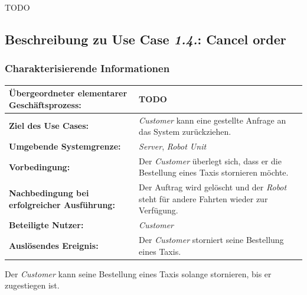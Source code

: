 				TODO
				
				
				\pagebreak
		
			\subsection*{Beschreibung zu Use Case \emph{1.4.}: Cancel order}
				\subsubsection*{Charakterisierende Informationen}
				
				\begin{table}[H]
					\centering
					\begin{tabularx}{\textwidth}{|p{5cm}|X|}
						\hline
						\textbf{Übergeordneter elementarer Geschäftsprozess:} & TODO  \\ \hline
						\textbf{Ziel des Use Cases:} & \emph{Customer} kann eine gestellte Anfrage an das System zurückziehen. \\ \hline
						\textbf{Umgebende Systemgrenze:} & \emph{Server}, \emph{Robot Unit} \\ \hline
						\textbf{Vorbedingung:} & Der \emph{Customer} überlegt sich, dass er die Bestellung eines Taxis stornieren möchte. \\ \hline
						\textbf{Nachbedingung bei erfolgreicher Ausführung:} & Der Auftrag wird gelöscht und der \emph{Robot} steht für andere Fahrten wieder zur Verfügung. \\ \hline
						\textbf{Beteiligte Nutzer:} & \emph{Customer} \\ \hline
						\textbf{Auslösendes Ereignis:} & Der \emph{Customer} storniert seine Bestellung eines Taxis. \\
						\hline
					\end{tabularx}
				\end{table}
				
				Der \emph{Customer} kann seine Bestellung eines Taxis solange stornieren, bis er zugestiegen ist.
				
			

